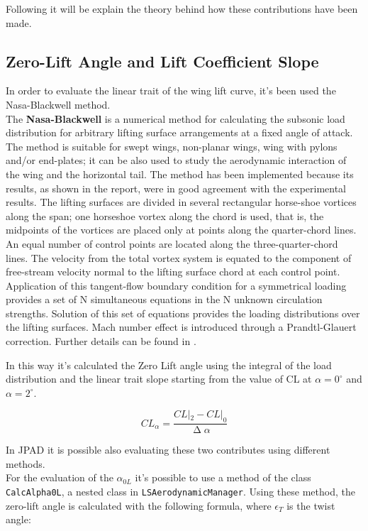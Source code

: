 Following it will be explain the theory behind how these contributions have been made.

\subsection{Zero-Lift Angle and Lift Coefficient Slope}

In order to evaluate the linear trait of the wing lift curve, it's been used the Nasa-Blackwell method.\\ The {\bfseries Nasa-Blackwell} is a numerical method for calculating the subsonic load distribution for arbitrary lifting surface arrangements at a fixed angle of attack. The method is suitable for swept wings, non-planar wings, wing with pylons and/or end-plates; it can be also used to study the aerodynamic interaction of the wing and the horizontal tail. The method has been implemented because its results, as shown in the report, were in good agreement with the experimental results.
The lifting surfaces are divided in several rectangular horse-shoe vortices along the span; one horseshoe vortex along the chord is used, that is, the midpoints of the vortices are placed only at points along the quarter-chord lines. An equal number of control points are located along the three-quarter-chord lines. The velocity from the total vortex system is equated to the component of free-stream velocity normal to the lifting surface chord at each control point. Application of this tangent-flow boundary condition for a symmetrical loading provides a set of N simultaneous equations in the N unknown circulation strengths. Solution of this set of equations provides the loading distributions over the lifting surfaces. Mach number effect is introduced through a Prandtl-Glauert correction. Further details can be found in \cite{NASA:Blackwell}.

In this way it's calculated the Zero Lift angle using the integral of the load distribution and the linear trait slope starting from the value of CL at $\alpha =  0^{\circ}$ and $\alpha = 2^{\circ}$.

\begin{equation}
CL_{\alpha}= \frac{CL|_2 - CL|_0}{\upDelta \alpha}
\end{equation}

In JPAD it is possible also evaluating these two contributes using different methods. \\
For the evaluation of the $\alpha_{0L}$ it's possible to use a method of the class \texttt{CalcAlpha0L}, a nested class  in \texttt{LSAerodynamicManager}. Using these method, the zero-lift angle is calculated with the following formula, where $\epsilon_T$ is the twist angle:

